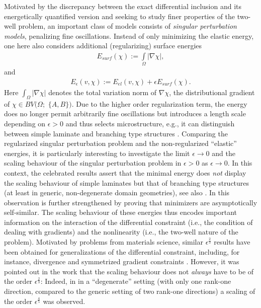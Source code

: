 \documentclass[a4paper, 10pt, twoside, notitlepage]{amsart}
\theoremstyle{plain}
\begin{document}
	Motivated by the discrepancy between the exact differential inclusion and its energetically quantified version and seeking to study finer properties of the two-well problem, an important  class of models consists of \emph{singular perturbation models}, penalizing fine oscillations. Instead of only minimizing the elastic energy, one here also considers additional (regularizing) surface energies
	\begin{align*}
		E_{surf}(\chi):= \int\limits_{\Omega} |\nabla \chi|,
	\end{align*} 
	and
	\begin{align*}
		E_{\epsilon}(v,\chi) := E_{el}( v, \chi) + \epsilon E_{surf}(\chi).
	\end{align*}
	Here $\int_{\Omega} |\nabla \chi|$ denotes the total variation norm of $\nabla \chi$, the distributional gradient of $\chi \in BV(\Omega;$ $ \{A,B\})$.  Due to the higher order regularization term, the energy does no longer permit arbitrarily
	fine oscillations but introduces a length scale depending on $\epsilon>0$ and thus selects microstructure, e.g., it can distinguish between simple laminate and branching type
	structures \cite{KM92,KM94}. Comparing the regularized singular perturbation problem and the non-regularized ``elastic'' energies, it is particularly interesting to investigate the limit
	$\epsilon \rightarrow 0$ and the scaling behaviour of the singular perturbation problem in $\epsilon>0$ as $\epsilon \rightarrow 0$. In this context, the celebrated results \cite{KM92,KM94}
	assert that the minimal energy does \emph{not} display the scaling behaviour of simple laminates but that of branching type structures (at least in generic, non-degenerate domain geometries),
	see also \cite{CC15}. In \cite{C1} this observation is further strengthened by proving that minimizers are asymptotically self-similar.  The scaling behaviour of these energies thus encodes
	important information on the interaction of the differential constraint (i.e., the condition of dealing with gradients) and the nonlinearity (i.e., the two-well nature of the problem).
	Motivated by problems from materials science, similar $\epsilon^{\frac{2}{3}}$ results have been obtained for generalizations of the differential constraint, including, for instance,
	divergence and symmetrized gradient constraints \cite{CO09, CO12, KW14,CKO99}. However, it was pointed out in the work \cite{CC15} that the scaling behaviour does not \emph{always} have to be
	of the order $\epsilon^{\frac{2}{3}}$: Indeed, in \cite{CC15} in a ``degenerate'' setting (with only one rank-one direction, compared to the generic setting of two rank-one directions) a scaling of the order $\epsilon^{\frac{4}{5}}$ was observed.
	
\end{document}

